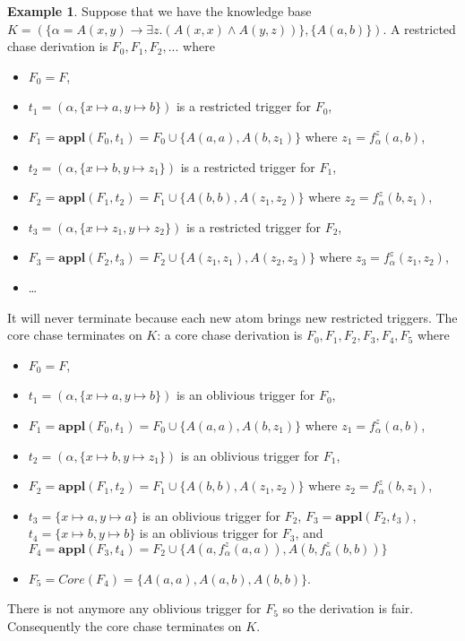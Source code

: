\documentclass{article}
\theoremstyle{definition}
\newtheorem{example}{Example}[section]
\theoremstyle{remark}
\newcommand{\Appl}{\textbf{appl}}
\begin{document}
\begin{example}
Suppose that we have the knowledge base $K=(\{\alpha = A(x,y) \rightarrow \exists z.(A(x,x) \wedge A(y,z))\},\{A(a,b)\})$. A restricted chase derivation is $F_0,F_1,F_2,...$ where 
\begin{itemize}
\item $F_0 = F$,
\item $t_1=(\alpha,\{x \mapsto a, y \mapsto b\})$ is a restricted trigger for $F_0$, 
\item $F_1= \Appl(F_0,t_1)= F_0 \cup \{A(a,a),A(b,z_1)\}$ where $z_1 = f_\alpha^z(a,b)$,
\item $t_2 = (\alpha,\{x \mapsto b, y \mapsto z_1\})$ is a restricted trigger for $F_1$, 
\item $F_2 = \Appl(F_1,t_2)= F_1 \cup \{A(b,b),A(z_1,z_2)\}$ where $z_2 = f_\alpha^z(b,z_1)$, 
\item $t_3 = (\alpha,\{x \mapsto z_1, y \mapsto z_2\})$ is a restricted trigger for $F_2$, 
\item $F_3 = \Appl(F_2,t_3)=  F_2 \cup \{A(z_1,z_1),A(z_2,z_3)\}$ where $z_3 = f_\alpha^z(z_1,z_2)$,
\item \ldots\
\end{itemize}
It will never terminate because each new atom brings new restricted triggers. The core chase terminates on $K$: a core chase derivation is $F_0,F_1,F_2,F_3,F_4,F_5$ where 
\begin{itemize}
\item $F_0=F$, 
\item $t_1=(\alpha,\{x \mapsto a, y \mapsto b\})$ is an oblivious trigger for $F_0$, 
\item $F_1=\Appl(F_0,t_1) =F_0 \cup \{A(a,a),A(b,z_1)\}$ where $z_1 = f_\alpha^z(a,b)$, 
\item $t_2 = (\alpha,\{x \mapsto b, y \mapsto z_1\})$ is an oblivious trigger for $F_1$,
\item $F_2 =\Appl(F_1,t_2) =F_1 \cup \{A(b,b),A(z_1,z_2)\}$ where $z_2 = f_\alpha^z(b,z_1)$,
\item $t_3 = \{x \mapsto a, y \mapsto a\}$ is an oblivious trigger for $F_2$, $F_3=\Appl(F_2,t_3)$, $t_4 = \{x \mapsto b, y \mapsto b\}$ is an oblivious trigger for $F_3$, and $F_4=\Appl(F_3,t_4) = F_2 \cup \{A(a,f_\alpha^z(a,a)),A(b,f_\alpha^z(b,b))\}$
\item $F_5 = \textit{Core}(F_4)= \{A(a,a),A(a,b),A(b,b)\}$.
\end{itemize} 
There is not anymore any oblivious trigger for $F_5$ so the derivation is fair. Consequently the core chase terminates on $K$.

\end{example}
\end{document}
